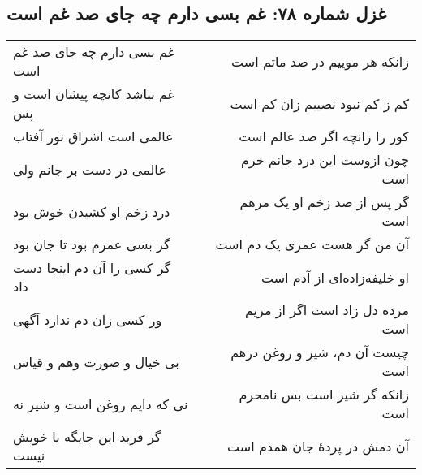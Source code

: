 \begin{center}
\section*{غزل شماره ۷۸: غم بسی دارم چه جای صد غم است}
\label{sec:078}
\begin{longtable}{l p{0.5cm} r}
غم بسی دارم چه جای صد غم است
&&
زانکه هر موییم در صد ماتم است
\\
غم نباشد کانچه پیشان است و پس
&&
کم ز کم نبود نصیبم زان کم است
\\
عالمی است اشراق نور آفتاب
&&
کور را زانچه اگر صد عالم است
\\
عالمی در دست بر جانم ولی
&&
چون ازوست این درد جانم خرم است
\\
درد زخم او کشیدن خوش بود
&&
گر پس از صد زخم او یک مرهم است
\\
گر بسی عمرم بود تا جان بود
&&
آن من گر هست عمری یک دم است
\\
گر کسی را آن دم اینجا دست داد
&&
او خلیفه‌زاده‌ای از آدم است
\\
ور کسی زان دم ندارد آگهی
&&
مرده دل زاد است اگر از مریم است
\\
بی خیال و صورت وهم و قیاس
&&
چیست آن دم، شیر و روغن درهم است
\\
نی که دایم روغن است و شیر نه
&&
زانکه گر شیر است بس نامحرم است
\\
گر فرید این جایگه با خویش نیست
&&
آن دمش در پردهٔ جان همدم است
\\
\end{longtable}
\end{center}
